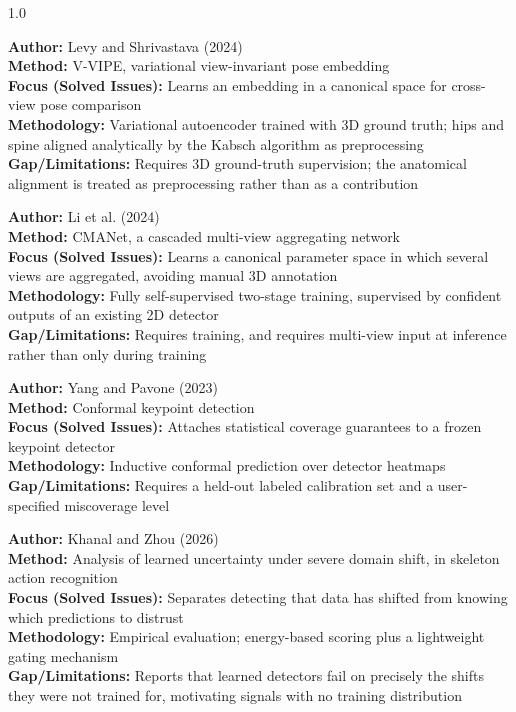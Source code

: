 \documentclass[12pt,a4paper]{report}
\begin{document}
\begin{spacing}{1.0}
\vspace{0.18cm}

\noindent \textbf{Author:} Levy and Shrivastava (2024) \\
\textbf{Method:} V-VIPE, variational view-invariant pose embedding \\
\textbf{Focus (Solved Issues):} Learns an embedding in a canonical space for cross-view pose comparison \\
\textbf{Methodology:} Variational autoencoder trained with 3D ground truth; hips and spine aligned analytically by the Kabsch algorithm as preprocessing \\
\textbf{Gap/Limitations:} Requires 3D ground-truth supervision; the anatomical alignment is treated as preprocessing rather than as a contribution

\vspace{0.18cm}

\noindent \textbf{Author:} Li et al. (2024) \\
\textbf{Method:} CMANet, a cascaded multi-view aggregating network \\
\textbf{Focus (Solved Issues):} Learns a canonical parameter space in which several views are aggregated, avoiding manual 3D annotation \\
\textbf{Methodology:} Fully self-supervised two-stage training, supervised by confident outputs of an existing 2D detector \\
\textbf{Gap/Limitations:} Requires training, and requires multi-view input at inference rather than only during training

\vspace{0.18cm}

\noindent \textbf{Author:} Yang and Pavone (2023) \\
\textbf{Method:} Conformal keypoint detection \\
\textbf{Focus (Solved Issues):} Attaches statistical coverage guarantees to a frozen keypoint detector \\
\textbf{Methodology:} Inductive conformal prediction over detector heatmaps \\
\textbf{Gap/Limitations:} Requires a held-out labeled calibration set and a user-specified miscoverage level

\vspace{0.18cm}

\noindent \textbf{Author:} Khanal and Zhou (2026) \\
\textbf{Method:} Analysis of learned uncertainty under severe domain shift, in skeleton action recognition \\
\textbf{Focus (Solved Issues):} Separates detecting that data has shifted from knowing which predictions to distrust \\
\textbf{Methodology:} Empirical evaluation; energy-based scoring plus a lightweight gating mechanism \\
\textbf{Gap/Limitations:} Reports that learned detectors fail on precisely the shifts they were not trained for, motivating signals with no training distribution


\end{spacing}
\end{document}
